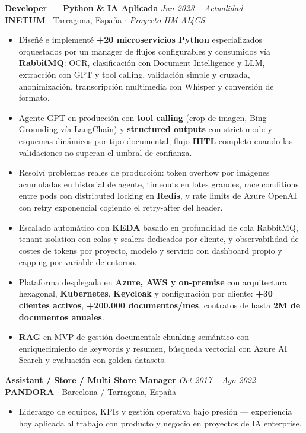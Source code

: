 \documentclass[11pt,a4paper]{article}
\begin{document}
\textbf{Developer --- Python \& IA Aplicada} \hfill \textit{Jun 2023 -- Actualidad}\\[0.12em]
\textbf{INETUM} $\cdot$ Tarragona, España $\cdot$ \textit{Proyecto IIM-AI4CS}\\[0.15em]
\begin{itemize}
    \item Diseñé e implementé \textbf{+20 microservicios Python} especializados orquestados por un manager de flujos configurables y consumidos vía \textbf{RabbitMQ}: OCR, clasificación con Document Intelligence y LLM, extracción con GPT y tool calling, validación simple y cruzada, anonimización, transcripción multimedia con Whisper y conversión de formato.
    \item Agente GPT en producción con \textbf{tool calling} (crop de imagen, Bing Grounding vía LangChain) y \textbf{structured outputs} con strict mode y esquemas dinámicos por tipo documental; flujo \textbf{HITL} completo cuando las validaciones no superan el umbral de confianza.
    \item Resolví problemas reales de producción: token overflow por imágenes acumuladas en historial de agente, timeouts en lotes grandes, race conditions entre pods con distributed locking en \textbf{Redis}, y rate limits de Azure OpenAI con retry exponencial cogiendo el retry-after del header.
    \item Escalado automático con \textbf{KEDA} basado en profundidad de cola RabbitMQ, tenant isolation con colas y scalers dedicados por cliente, y observabilidad de costes de tokens por proyecto, modelo y servicio con dashboard propio y capping por variable de entorno.
    \item Plataforma desplegada en \textbf{Azure, AWS y on-premise} con arquitectura hexagonal, \textbf{Kubernetes}, \textbf{Keycloak} y configuración por cliente: \textbf{+30 clientes activos}, \textbf{+200.000 documentos/mes}, contratos de hasta \textbf{2M de documentos anuales}.
    \item \textbf{RAG} en MVP de gestión documental: chunking semántico con enriquecimiento de keywords y resumen, búsqueda vectorial con Azure AI Search y evaluación con golden datasets.
\end{itemize}

\vspace{0.5em}
\textbf{Assistant / Store / Multi Store Manager} \hfill \textit{Oct 2017 -- Ago 2022}\\[0.12em]
\textbf{PANDORA} $\cdot$ Barcelona / Tarragona, España\\[0.15em]
\begin{itemize}
    \item Liderazgo de equipos, KPIs y gestión operativa bajo presión --- experiencia hoy aplicada al trabajo con producto y negocio en proyectos de IA enterprise.
\end{itemize}
\end{document}
